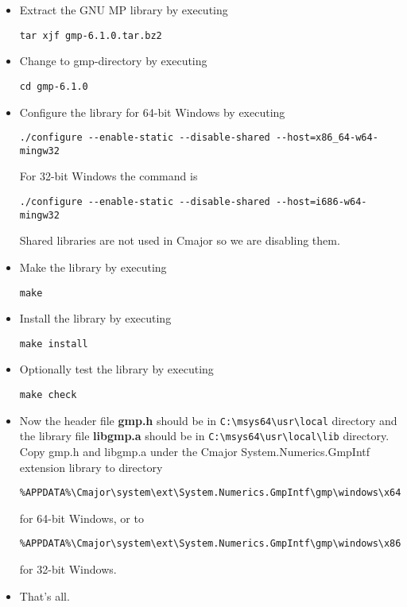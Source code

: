\documentclass[a4paper,oneside,11.000000pt]{book}
\begin{document}
\begin{itemize}
\item
Extract the GNU MP library by executing
\begin{verbatim}
tar xjf gmp-6.1.0.tar.bz2
\end{verbatim}

\item
Change to gmp-directory by executing
\begin{verbatim}
cd gmp-6.1.0
\end{verbatim}

\item
Configure the library for 64-bit Windows by executing
\begin{verbatim}
./configure --enable-static --disable-shared --host=x86_64-w64-mingw32
\end{verbatim}

For 32-bit Windows the command is
\begin{verbatim}
./configure --enable-static --disable-shared --host=i686-w64-mingw32
\end{verbatim}

Shared libraries are not used in Cmajor so we are disabling them.

\item
Make the library by executing
\begin{verbatim}
make
\end{verbatim}

\item
Install the library by executing
\begin{verbatim}
make install
\end{verbatim}

\item
Optionally test the library by executing
\begin{verbatim}
make check
\end{verbatim}

\item
Now the header file \textbf{gmp.h} should be in \verb|C:\msys64\usr\local| directory
and the library file \textbf{libgmp.a} should be in \verb|C:\msys64\usr\local\lib| directory.
Copy gmp.h and libgmp.a under the Cmajor System.Numerics.GmpIntf extension library to directory

\begin{verbatim}
%APPDATA%\Cmajor\system\ext\System.Numerics.GmpIntf\gmp\windows\x64
\end{verbatim}
for 64-bit Windows, or to
\begin{verbatim}
%APPDATA%\Cmajor\system\ext\System.Numerics.GmpIntf\gmp\windows\x86
\end{verbatim}
for 32-bit Windows.

\item
That's all.

\end{itemize}
\end{document}
